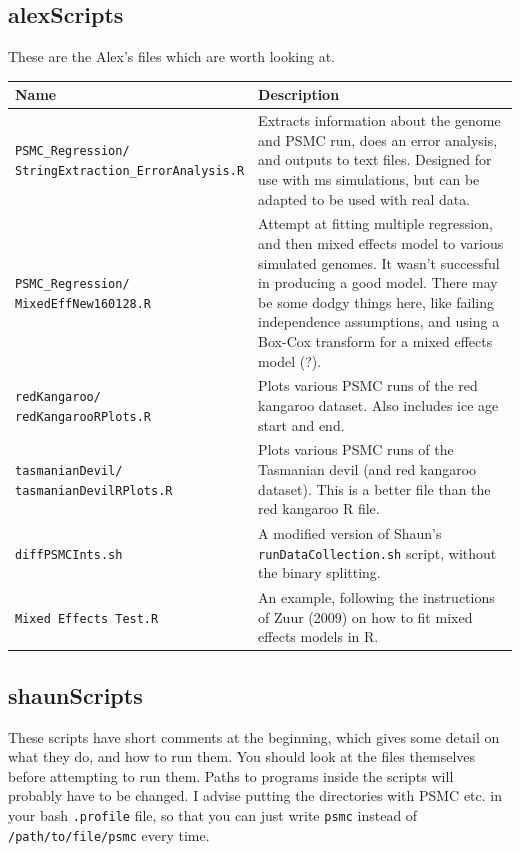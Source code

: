 \documentclass[11pt,a4paper]{article}
\begin{document}
\subsection{alexScripts}
These are the Alex's files which are worth looking at.
\begin{table}[h]
\begin{tabular}{p{6.5cm}p{8.5cm}}
  \hline
  \textbf{Name} & \textbf{Description} \\ 
  \hline
\parbox[t]{5cm}{\texttt{PSMC\_Regression/}\\ \texttt{StringExtraction\_ErrorAnalysis.R}} & Extracts information about the genome and PSMC run, does an error analysis, and outputs to text files. Designed for use with ms simulations, but can be adapted to be used with real data.\\ \hline
  \parbox[t]{5cm}{\texttt{PSMC\_Regression/}\\ \texttt{MixedEffNew160128.R}} & Attempt at fitting multiple regression, and then mixed effects model to various simulated genomes. It wasn't successful in producing a good model. There may be some dodgy things here, like failing independence assumptions, and using a Box-Cox transform for a mixed effects model (?). \\ \hline
  \parbox[t]{5cm}{\texttt{redKangaroo/}\\ \texttt{redKangarooRPlots.R}} & Plots various PSMC runs of the red kangaroo dataset. Also includes ice age start and end. \\ \hline
  \parbox[t]{5cm}{\texttt{tasmanianDevil/}\\ \texttt{tasmanianDevilRPlots.R}} & Plots various PSMC runs of the Tasmanian devil (and red kangaroo dataset). This is a better file than the red kangaroo R file. \\ \hline
  \texttt{diffPSMCInts.sh} & A modified version of Shaun's \verb|runDataCollection.sh| script, without the binary splitting. \\
  \texttt{Mixed Effects Test.R} & An example, following the instructions of Zuur (2009) on how to fit mixed effects models in R. \\
  \hline
\end{tabular}
\end{table}

\subsection{shaunScripts}
These scripts have short comments at the beginning, which gives some detail on what they do, and how to run them. You should look at the files themselves before attempting to run them. Paths to programs inside the scripts will probably have to be changed. I advise putting the directories with PSMC etc. in your bash \verb|.profile| file, so that you can just write \verb|psmc| instead of \verb|/path/to/file/psmc| every time.
\end{document}
